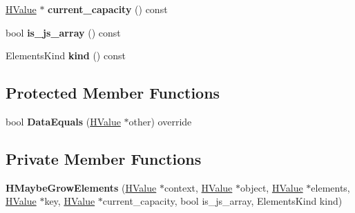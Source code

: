 \begin{DoxyCompactItemize}
\item 
\hyperlink{classv8_1_1internal_1_1_h_value}{H\+Value} $\ast$ {\bfseries current\+\_\+capacity} () const \hypertarget{classv8_1_1internal_1_1_h_maybe_grow_elements_a2257ed2498857576387b90027045b5d7}{}\label{classv8_1_1internal_1_1_h_maybe_grow_elements_a2257ed2498857576387b90027045b5d7}

\item 
bool {\bfseries is\+\_\+js\+\_\+array} () const \hypertarget{classv8_1_1internal_1_1_h_maybe_grow_elements_ad60eef368dbb76a3b6cff1730e5620f0}{}\label{classv8_1_1internal_1_1_h_maybe_grow_elements_ad60eef368dbb76a3b6cff1730e5620f0}

\item 
Elements\+Kind {\bfseries kind} () const \hypertarget{classv8_1_1internal_1_1_h_maybe_grow_elements_acba260e9a0f58143738c27fd248848bd}{}\label{classv8_1_1internal_1_1_h_maybe_grow_elements_acba260e9a0f58143738c27fd248848bd}

\end{DoxyCompactItemize}
\subsection*{Protected Member Functions}
\begin{DoxyCompactItemize}
\item 
bool {\bfseries Data\+Equals} (\hyperlink{classv8_1_1internal_1_1_h_value}{H\+Value} $\ast$other) override\hypertarget{classv8_1_1internal_1_1_h_maybe_grow_elements_a5b3bcb7c677862bf4eeac3931691ba4f}{}\label{classv8_1_1internal_1_1_h_maybe_grow_elements_a5b3bcb7c677862bf4eeac3931691ba4f}

\end{DoxyCompactItemize}
\subsection*{Private Member Functions}
\begin{DoxyCompactItemize}
\item 
{\bfseries H\+Maybe\+Grow\+Elements} (\hyperlink{classv8_1_1internal_1_1_h_value}{H\+Value} $\ast$context, \hyperlink{classv8_1_1internal_1_1_h_value}{H\+Value} $\ast$object, \hyperlink{classv8_1_1internal_1_1_h_value}{H\+Value} $\ast$elements, \hyperlink{classv8_1_1internal_1_1_h_value}{H\+Value} $\ast$key, \hyperlink{classv8_1_1internal_1_1_h_value}{H\+Value} $\ast$current\+\_\+capacity, bool is\+\_\+js\+\_\+array, Elements\+Kind kind)\hypertarget{classv8_1_1internal_1_1_h_maybe_grow_elements_a2d088d9c48107396e57bba3815dba92b}{}\label{classv8_1_1internal_1_1_h_maybe_grow_elements_a2d088d9c48107396e57bba3815dba92b}

\end{DoxyCompactItemize}
